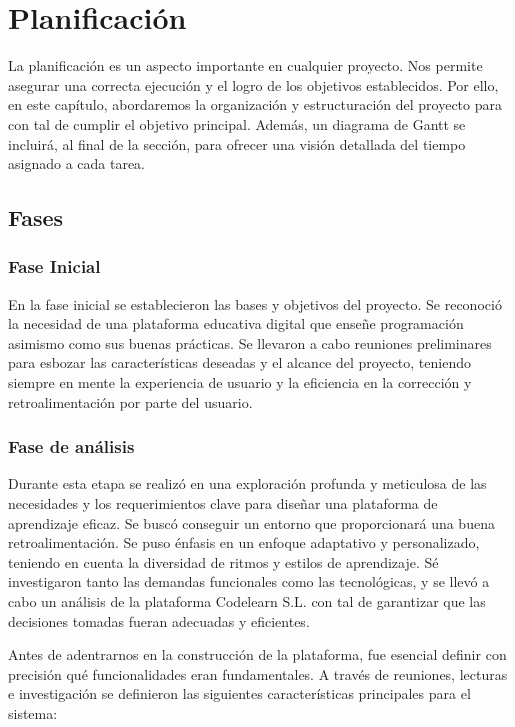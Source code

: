 \chapter{Planificación} \label{chap:planification}

La planificación es un aspecto importante en cualquier proyecto. Nos permite asegurar una correcta ejecución y el logro de los objetivos establecidos. Por ello, en este capítulo, abordaremos la organización y estructuración del proyecto para con tal de cumplir el objetivo principal. Además, un diagrama de Gantt se incluirá, al final de la sección, para ofrecer una visión detallada del tiempo asignado a cada tarea.

\section{Fases}

\subsection{Fase Inicial}

En la fase inicial se establecieron las bases y objetivos del proyecto. Se reconoció la necesidad de una plataforma educativa digital que enseñe programación asimismo como sus buenas prácticas. Se llevaron a cabo reuniones preliminares para esbozar las características deseadas y el alcance del proyecto, teniendo siempre en mente la experiencia de usuario y la eficiencia en la corrección y retroalimentación por parte del usuario.

\subsection{Fase de análisis}

Durante esta etapa se realizó en una exploración profunda y meticulosa de las necesidades y los requerimientos clave para diseñar una plataforma de aprendizaje eficaz. Se buscó conseguir un entorno que proporcionará una buena retroalimentación. Se puso énfasis en un enfoque adaptativo y personalizado, teniendo en cuenta la diversidad de ritmos y estilos de aprendizaje. Sé investigaron tanto las demandas funcionales como las tecnológicas, y se llevó a cabo un análisis de la plataforma Codelearn S.L. con tal de garantizar que las decisiones tomadas fueran adecuadas y eficientes.

Antes de adentrarnos en la construcción de la plataforma, fue esencial definir con precisión qué funcionalidades eran fundamentales. A través de reuniones, lecturas e investigación se definieron las siguientes características principales para el sistema:

